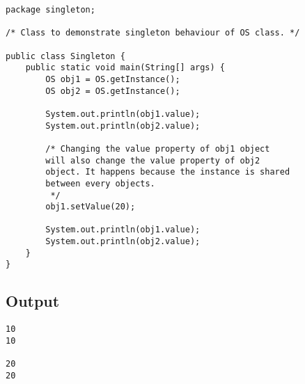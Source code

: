 \begin{verbatim}
package singleton;

/* Class to demonstrate singleton behaviour of OS class. */

public class Singleton {
    public static void main(String[] args) {
        OS obj1 = OS.getInstance();
        OS obj2 = OS.getInstance();

        System.out.println(obj1.value);
        System.out.println(obj2.value);

        /* Changing the value property of obj1 object
        will also change the value property of obj2
        object. It happens because the instance is shared
        between every objects.
         */
        obj1.setValue(20);

        System.out.println(obj1.value);
        System.out.println(obj2.value);
    }
}
\end{verbatim}

\subsection{Output}

\begin{verbatim}
10
10

20
20
\end{verbatim}